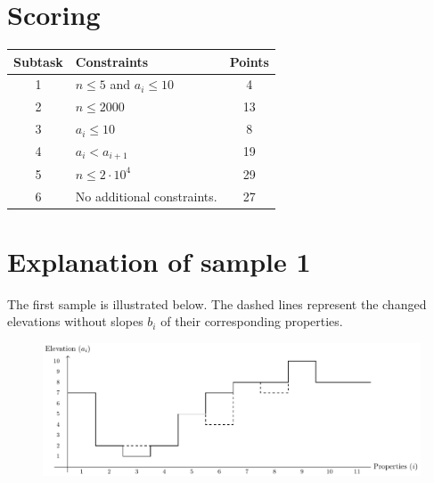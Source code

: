 \section*{Scoring}
\begin{center}
\begin{tabular}{|c|p{13cm}|c|}
\hline
\textbf{Subtask} & \textbf{Constraints} & \textbf{Points} \\ \hline
1 & $n \leq 5$ and $a_{i} \leq 10$ & 4 \\\hline
2 & $n \leq 2000$ & 13 \\\hline
3 & $a_{i}\leq 10$ & 8 \\\hline
4 & $a_{i} < a_{i+1}$ & 19 \\\hline
5 & $n \leq 2\cdot10^4$ & 29 \\\hline
6 & No additional constraints. & 27 \\\hline
\end{tabular}
\end{center}

\section*{Explanation of sample 1}
The first sample is illustrated below.
The dashed lines represent the changed elevations without slopes $b_i$ of their corresponding properties.

\begin{center}
\begin{figure}[h!]
    \centering
    \includegraphics[width=1\textwidth]{heights.pdf}
\end{figure}
\end{center}
